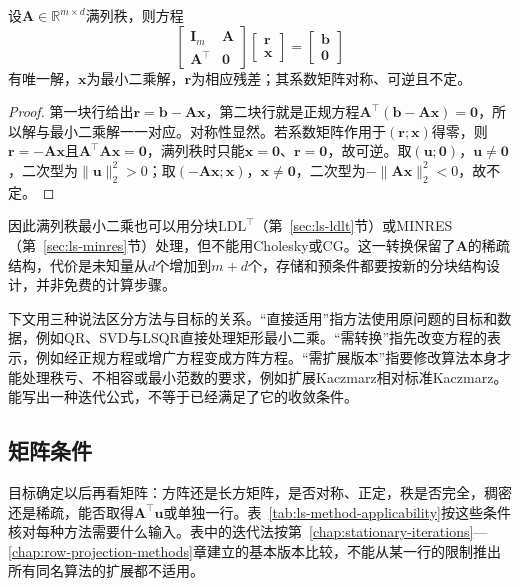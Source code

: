 \begin{theorem}[最小二乘的增广方程]
\label{thm:ls-augmented-kkt-system}
设$\bm A\in\mathbb R^{m\times d}$满列秩，则方程
\[
 \begin{bmatrix}\bm I_m&\bm A\\ \bm A^\top&\bm0\end{bmatrix}
 \begin{bmatrix}\bm r\\ \bm x\end{bmatrix}
 =\begin{bmatrix}\bm b\\ \bm0\end{bmatrix}
\]
有唯一解，$\bm x$为最小二乘解，$\bm r$为相应残差；其系数矩阵对称、可逆且不定。
\end{theorem}
\begin{proof}
第一块行给出$\bm r=\bm b-\bm A\bm x$，第二块行就是正规方程$\bm A^\top(\bm b-\bm A\bm x)=\bm0$，所以解与最小二乘解一一对应。对称性显然。若系数矩阵作用于$(\bm r;\bm x)$得零，则$\bm r=-\bm A\bm x$且$\bm A^\top\bm A\bm x=\bm0$，满列秩时只能$\bm x=\bm0$、$\bm r=\bm0$，故可逆。取$(\bm u;\bm0)$，$\bm u\ne\bm0$，二次型为$\lVert\bm u\rVert_2^2>0$；取$(-\bm A\bm x;\bm x)$，$\bm x\ne\bm0$，二次型为$-\lVert\bm A\bm x\rVert_2^2<0$，故不定。
\end{proof}

因此满列秩最小二乘也可以用分块$\mathrm{LDL}^\top$（第~\ref{sec:ls-ldlt}节）或MINRES（第~\ref{sec:ls-minres}节）处理，但不能用Cholesky或CG。这一转换保留了$\bm A$的稀疏结构，代价是未知量从$d$个增加到$m+d$个，存储和预条件都要按新的分块结构设计，并非免费的计算步骤。

下文用三种说法区分方法与目标的关系。“直接适用”指方法使用原问题的目标和数据，例如QR、SVD与LSQR直接处理矩形最小二乘。“需转换”指先改变方程的表示，例如经正规方程或增广方程变成方阵方程。“需扩展版本”指要修改算法本身才能处理秩亏、不相容或最小范数的要求，例如扩展Kaczmarz相对标准Kaczmarz。能写出一种迭代公式，不等于已经满足了它的收敛条件。

\subsection{矩阵条件}
\label{sec:ls-method-selection-matrix}

目标确定以后再看矩阵：方阵还是长方矩阵，是否对称、正定，秩是否完全，稠密还是稀疏，能否取得$\bm A^\top\bm u$或单独一行。表~\ref{tab:ls-method-applicability}按这些条件核对每种方法需要什么输入。表中的迭代法按第~\ref{chap:stationary-iterations}—\ref{chap:row-projection-methods}章建立的基本版本比较，不能从某一行的限制推出所有同名算法的扩展都不适用。

